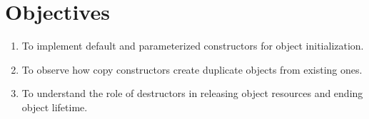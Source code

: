 \section{Objectives}
\begin{enumerate}
  \item To implement default and parameterized constructors for object initialization.
  \item To observe how copy constructors create duplicate objects from existing ones.
  \item To understand the role of destructors in releasing object resources and ending object lifetime.
\end{enumerate}
